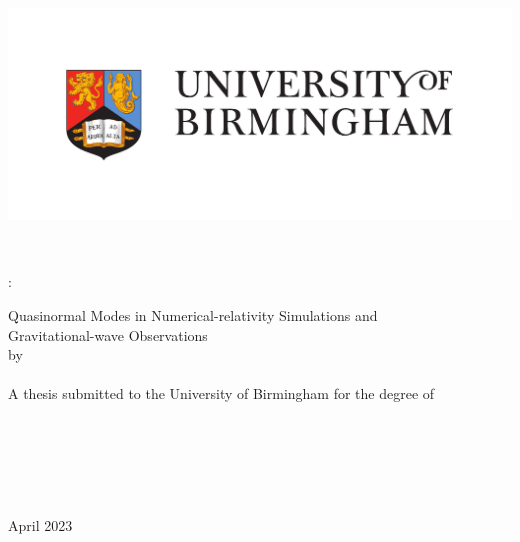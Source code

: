 \documentclass[
12pt, %
english, %
doublespacing, %
headsepline, %
]{MastersDoctoralThesis} %
\author{Eliot Finch} %
\begin{document}
\frontmatter %

\pagestyle{plain} %

\begin{singlespacing}


\begin{titlepage}
\begin{center}

\includegraphics[width=0.8\columnwidth]{Figures/full-colour-logo.pdf}

\HRule \\[0.2cm] %
{\scshape\huge \ttitle:\par}\vspace{0.4cm} %
Quasinormal Modes in Numerical-relativity Simulations and \\
Gravitational-wave Observations\vspace{0.1cm}
\HRule \\[1.cm] %

by\\[0.9cm]
{\scshape \large \authorname}\\[2.cm]

A thesis submitted to the University of Birmingham for the degree of \\[0.1cm]
{\textsc \degreename}\\[2cm]

\vfill

\begin{flushright} \normalsize
\groupname\\
\deptname\\
\facname\\
\univname\\[0.7cm]
April 2023


\end{flushright}
\end{center}
\end{titlepage}
\end{singlespacing}
\end{document}
